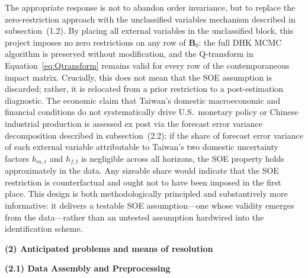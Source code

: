 The appropriate response is not to abandon order invariance, but to replace the zero-restriction approach with the unclassified variables mechanism described in subsection~(1.2). By placing all external variables in the unclassified block, this project imposes no zero restrictions on any row of $\mathbf{B}_0$: the full DHK MCMC algorithm is preserved without modification, and the Q-transform in Equation~\eqref{eq:Qtransform} remains valid for every row of the contemporaneous impact matrix. Crucially, this does not mean that the SOE assumption is discarded; rather, it is relocated from a prior restriction to a post-estimation diagnostic. The economic claim that Taiwan's domestic macroeconomic and financial conditions do not systematically drive U.S.\ monetary policy or Chinese industrial production is assessed ex post via the forecast error variance decomposition described in subsection~(2.2): if the share of forecast error variance of each external variable attributable to Taiwan's two domestic uncertainty factors $h_{m,t}$ and $h_{f,t}$ is negligible across all horizons, the SOE property holds approximately in the data. Any sizeable share would indicate that the SOE restriction is counterfactual and ought not to have been imposed in the first place. This design is both methodologically principled and substantively more informative: it delivers a testable SOE assumption---one whose validity emerges from the data---rather than an untested assumption hardwired into the identification scheme.

\bigskip

\noindent\textbf{(2) Anticipated problems and means of resolution}

\bigskip

\noindent\textbf{(2.1) Data Assembly and Preprocessing}

\medskip

